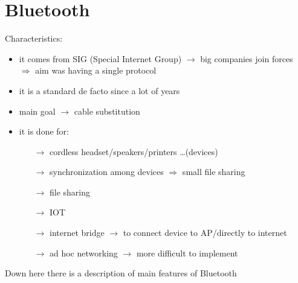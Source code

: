 \section{Bluetooth}
Characteristics:
\begin{itemize}
    \item it comes from SIG (Special Internet Group) $\rightarrow$ big companies join forces\\
    $\Rightarrow$ aim was having a single protocol
    \item it is a standard de facto since a lot of years
    \item main goal $\rightarrow$ cable substitution
    \item it is done for:
    \begin{itemize}
        \item[$\rightarrow$] cordless headset/speakers/printers \dots (devices)
        \item[$\rightarrow$] synchronization among devices $\Rightarrow$ small file sharing
        \item[$\rightarrow$] file sharing
        \item[$\rightarrow$] IOT
        \item[$\rightarrow$] internet bridge $\rightarrow$ to connect device to AP/directly to internet 
        \item[$\rightarrow$] ad hoc networking $\rightarrow$ more difficult to implement 
    \end{itemize}
\end{itemize}
Down here there is a description of main features of Bluetooth
